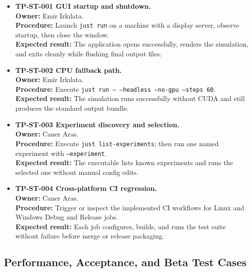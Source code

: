 \begin{itemize}[leftmargin=*]
	\item \textbf{TP-ST-001 GUI startup and shutdown.}\\
	      \textbf{Owner:} Emir Irkılata.\\
	      \textbf{Procedure:} Launch \texttt{just run} on a machine with a display server,
	      observe startup, then close the window.\\
	      \textbf{Expected result:} The application opens successfully, renders the simulation,
	      and exits cleanly while flushing final output files.

	\item \textbf{TP-ST-002 CPU fallback path.}\\
	      \textbf{Owner:} Emir Irkılata.\\
	      \textbf{Procedure:} Execute \texttt{just run -- --headless --no-gpu --steps 60}.\\
	      \textbf{Expected result:} The simulation runs successfully without CUDA and still
	      produces the standard output bundle.

	\item \textbf{TP-ST-003 Experiment discovery and selection.}\\
	      \textbf{Owner:} Caner Aras.\\
	      \textbf{Procedure:} Execute \texttt{just list-experiments}; then run one named
	      experiment with \texttt{--experiment}.\\
	      \textbf{Expected result:} The executable lists known experiments and runs the selected
	      one without manual config edits.

	\item \textbf{TP-ST-004 Cross-platform CI regression.}\\
	      \textbf{Owner:} Caner Aras.\\
	      \textbf{Procedure:} Trigger or inspect the implemented CI workflows for Linux and
	      Windows Debug and Release jobs.\\
	      \textbf{Expected result:} Each job configures, builds, and runs the test suite without
	      failure before merge or release packaging.
\end{itemize}

\subsection{Performance, Acceptance, and Beta Test Cases}

